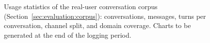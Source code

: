 \begin{figure}[ht]
\centering
{}
\caption[Conversation-corpus usage statistics (placeholder)]{Usage statistics of the real-user conversation corpus (Section~\ref{sec:evaluation:corpus}): conversations, messages, turns per conversation, channel split, and domain coverage. Charts to be generated at the end of the logging period.}\label{fig:corpus_usage}
\end{figure}
